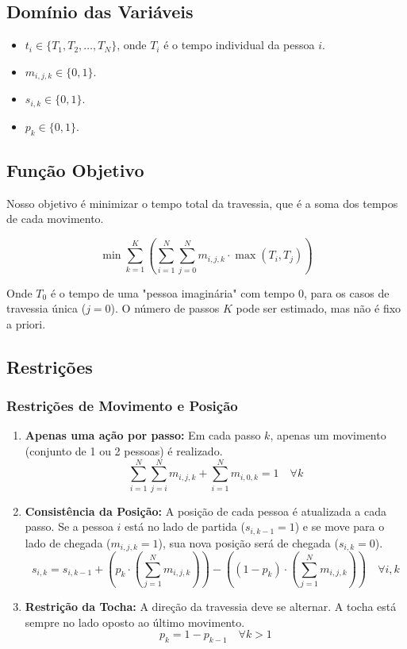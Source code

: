 \documentclass[12pt,a4paper]{article}
\begin{document}
\subsection*{Domínio das Variáveis}

\begin{itemize}
    \item $t_i \in \{T_1, T_2, \dots, T_N\}$, onde $T_i$ é o tempo individual da pessoa $i$.
    \item $m_{i,j,k} \in \{0, 1\}$.
    \item $s_{i,k} \in \{0, 1\}$.
    \item $p_k \in \{0, 1\}$.
\end{itemize}

\subsection*{Função Objetivo}
Nosso objetivo é minimizar o tempo total da travessia, que é a soma dos tempos de cada movimento.

$$
\min \sum_{k=1}^{K} \left( \sum_{i=1}^{N} \sum_{j=0}^{N} m_{i,j,k} \cdot \max(T_i, T_j) \right)
$$

Onde $T_0$ é o tempo de uma "pessoa imaginária" com tempo 0, para os casos de travessia única ($j=0$).
O número de passos $K$ pode ser estimado, mas não é fixo a priori.

\subsection*{Restrições}

\subsubsection*{Restrições de Movimento e Posição}
\begin{enumerate}
    \item \textbf{Apenas uma ação por passo:} Em cada passo $k$, apenas um movimento (conjunto de 1 ou 2 pessoas) é realizado.
    $$
    \sum_{i=1}^{N} \sum_{j=i}^{N} m_{i,j,k} + \sum_{i=1}^{N} m_{i,0,k} = 1 \quad \forall k
    $$
    \item \textbf{Consistência da Posição:} A posição de cada pessoa é atualizada a cada passo. Se a pessoa $i$ está no lado de partida ($s_{i,k-1}=1$) e se move para o lado de chegada ($m_{i,j,k}=1$), sua nova posição será de chegada ($s_{i,k}=0$).
    $$
    s_{i,k} = s_{i,k-1} + (p_k \cdot (\sum_{j=1}^{N} m_{i,j,k})) - ((1-p_k) \cdot (\sum_{j=1}^{N} m_{i,j,k})) \quad \forall i,k
    $$
    \item \textbf{Restrição da Tocha:} A direção da travessia deve se alternar. A tocha está sempre no lado oposto ao último movimento.
    $$
    p_k = 1 - p_{k-1} \quad \forall k > 1
    $$
\end{enumerate}
\end{document}
